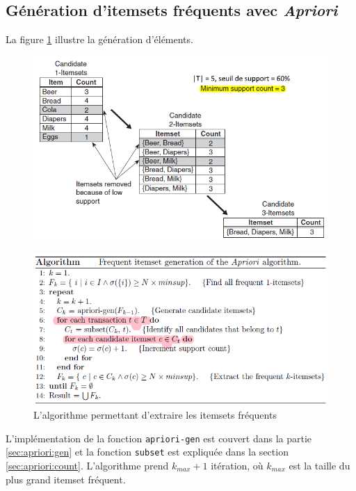 \documentclass[letterpaper, 12pt]{article}
\newcommand{\alinea}{
\hspace*{0.5cm}}
\begin{document}
		\subsection{Génération d'itemsets fréquents avec \textit{Apriori}}
			\alinea La figure \ref{fig:apriori:gen} illustre la génération
				d'éléments.
			\begin{figure}[H]
				\centering
				\includegraphics[scale=0.75]{Images/apriori_gen.png}
				\caption{}
				\label{fig:apriori:gen}
			\end{figure}\noindent
			\begin{figure}[H]
				\centering
				\includegraphics[scale=0.75]{Images/apriori_algo.png}
				\caption{L'algorithme permettant d'extraire les itemsets
						 fréquents}
				\label{fig:apriori:algo}
			\end{figure}\noindent
			L'implémentation de la fonction \texttt{apriori-gen} est
				couvert dans la partie \ref{sec:apriori:gen} et la 
				fonction \texttt{subset} est expliquée dans la section
				\ref{sec:apriori:count}. L'algorithme prend $k_{max} +1$
				itération, où $k_{max}$ est la taille du plus grand
				itemset fréquent.
\end{document}
